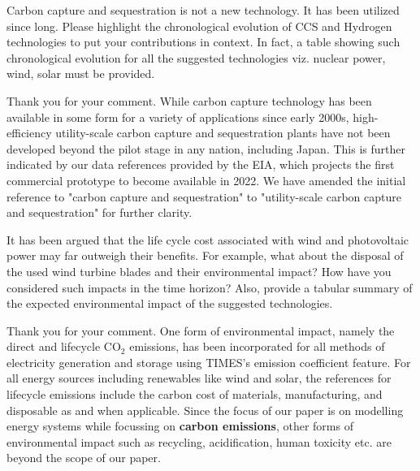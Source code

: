 \documentclass[answers,11pt]{exam}
\begin{document}
\begin{questions}
\begin{solution}
                 
        \end{solution}
        
                \question Carbon capture and sequestration is not a new technology. It has been utilized since long. Please highlight the chronological evolution of CCS and Hydrogen technologies to put your contributions in context. In fact, a table showing such chronological evolution for all the suggested technologies viz. nuclear power, wind, solar must be provided. 
        
        \begin{solution}
                 Thank you for your comment. While carbon capture technology has been available in some form for a variety of applications since early 2000s, high-efficiency utility-scale carbon capture and sequestration plants have not been developed beyond the pilot stage in any nation, including Japan. This is further indicated by our data references provided by the EIA, which projects the first commercial prototype to become available in 2022. We have amended the initial reference to "carbon capture and sequestration" to "utility-scale carbon capture and sequestration" for further clarity.
                 
                 
        \end{solution}
        
      
                        \question It has been argued that the life cycle cost associated with wind and photovoltaic power may far outweigh  their benefits. For example, what about the disposal of the used wind turbine blades and their environmental impact? How have you considered such impacts in the time horizon? Also, provide a tabular summary of the expected environmental impact of the suggested technologies. 
        
        \begin{solution}
        
                 Thank you for your comment. One form of environmental impact, namely the direct and lifecycle CO$_2$ emissions, has been incorporated for all methods of electricity generation and storage using TIMES's emission coefficient feature. For all energy sources including renewables like wind and solar, the references for lifecycle emissions include the carbon cost of materials, manufacturing, and disposable as and when applicable. Since the focus of our paper is on modelling energy systems while focussing on \textbf{carbon emissions}, other forms of environmental impact such as recycling, acidification, human toxicity etc. are beyond the scope of our paper.
                 

\end{solution}
\end{questions}
\end{document}
